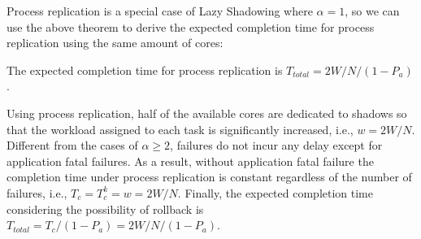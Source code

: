Process replication is a special case of Lazy Shadowing where $\alpha=1$, so we can use the above theorem to derive the expected completion time for process replication using the same amount of cores:

\begin{corollary}
The expected completion time for process replication is $T_{total} = 2W/N / (1 - P_a)$.
\end{corollary}
\begin{IEEEproof}
Using process replication, half of the available cores are dedicated to shadows so that the workload assigned to each task is significantly increased, i.e., $w=2W/N$. Different from the cases of $\alpha \ge 2$, failures do not incur any delay except for application fatal failures. %
As a result, without application fatal failure the completion time under process replication is constant regardless of the number of failures, i.e., $T_c=T_c^k=w=2W/N$. Finally, the expected completion time considering the possibility of rollback is $T_{total} = T_c / (1 - P_a) = 2W/N / (1 - P_a)$.
\end{IEEEproof}








